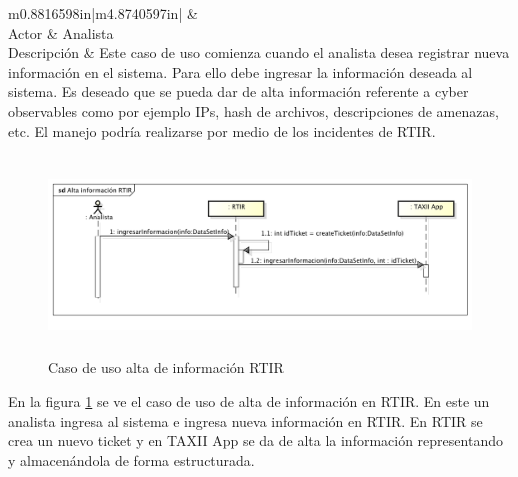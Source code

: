 \begin{flushleft}
	\tablefirsthead{}
	\tablehead{}
	\tabletail{}
	\tablelasttail{}
	\begin{supertabular}{m{0.8816598in}|m{4.8740597in}|}
		 &
		\\\hline
		{ Actor} &
		{ Analista}\\
		{ Descripción} &
		{ Este caso de uso comienza cuando el analista desea registrar nueva información en
			el sistema. Para ello debe ingresar la información deseada al sistema. Es deseado que se pueda dar de alta información
			referente a cyber observables como por ejemplo IPs, hash de archivos, descripciones de amenazas, etc. El manejo podría
			realizarse por medio de los incidentes de RTIR.}\\\hhline{~-}
	\end{supertabular}
\end{flushleft}

\begin{figure}
	\centering
	\includegraphics[width=5.7638in,height=2.0701in]{Analisis22-img/Analisis22-img026.png} 
	\caption{Caso de uso alta de información RTIR}
	\label{fig.altainfortir}
\end{figure}
{
	En la figura \ref{fig.altainfortir} se ve el caso de uso de alta de información en RTIR. En este un analista ingresa al sistema e ingresa
	nueva información en RTIR. En RTIR se crea un nuevo ticket y en TAXII App se da de alta la información representando y
	almacenándola de forma estructurada.}


\newpage
